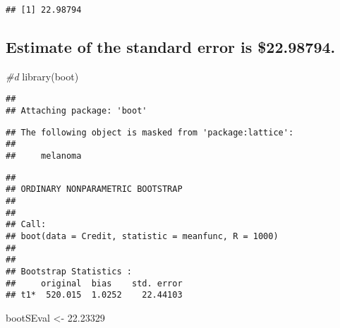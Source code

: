 \documentclass[
]{article}
\newenvironment{Shaded}{\begin{snugshade}}{\end{snugshade}}
\newcommand{\AttributeTok}[1]{\textcolor[rgb]{0.77,0.63,0.00}{#1}}
\newcommand{\CommentTok}[1]{\textcolor[rgb]{0.56,0.35,0.01}{\textit{#1}}}
\newcommand{\ControlFlowTok}[1]{\textcolor[rgb]{0.13,0.29,0.53}{\textbf{#1}}}
\newcommand{\DecValTok}[1]{\textcolor[rgb]{0.00,0.00,0.81}{#1}}
\newcommand{\FloatTok}[1]{\textcolor[rgb]{0.00,0.00,0.81}{#1}}
\newcommand{\FunctionTok}[1]{\textcolor[rgb]{0.00,0.00,0.00}{#1}}
\newcommand{\NormalTok}[1]{#1}
\newcommand{\OtherTok}[1]{\textcolor[rgb]{0.56,0.35,0.01}{#1}}
\newcommand{\SpecialCharTok}[1]{\textcolor[rgb]{0.00,0.00,0.00}{#1}}
\begin{document}
\begin{verbatim}
## [1] 22.98794
\end{verbatim}

\hypertarget{estimate-of-the-standard-error-is-22.98794.}{%
\subsection{Estimate of the standard error is
\$22.98794.}\label{estimate-of-the-standard-error-is-22.98794.}}

\begin{Shaded}
\begin{Highlighting}[]
\CommentTok{\#d}
\FunctionTok{library}\NormalTok{(boot)}
\end{Highlighting}
\end{Shaded}

\begin{verbatim}
## 
## Attaching package: 'boot'
\end{verbatim}

\begin{verbatim}
## The following object is masked from 'package:lattice':
## 
##     melanoma
\end{verbatim}

\begin{Shaded}
\end{Shaded}

\begin{verbatim}
## 
## ORDINARY NONPARAMETRIC BOOTSTRAP
## 
## 
## Call:
## boot(data = Credit, statistic = meanfunc, R = 1000)
## 
## 
## Bootstrap Statistics :
##     original  bias    std. error
## t1*  520.015  1.0252    22.44103
\end{verbatim}

\begin{Shaded}
\begin{Highlighting}[]
\NormalTok{bootSEval }\OtherTok{\textless{}{-}} \FloatTok{22.23329}
\end{Highlighting}
\end{Shaded}
\end{document}

